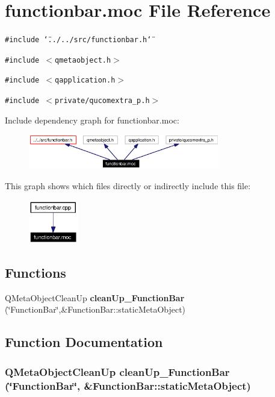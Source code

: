 \section{functionbar.moc File Reference}
\label{functionbar_8moc}


{\tt \#include \char`\"{}../../src/functionbar.h\char`\"{}}\par
{\tt \#include $<$qmetaobject.h$>$}\par
{\tt \#include $<$qapplication.h$>$}\par
{\tt \#include $<$private/qucomextra\_\-p.h$>$}\par


Include dependency graph for functionbar.moc:\begin{figure}[H]
\begin{center}
\leavevmode
\includegraphics[width=237pt]{functionbar_8moc__incl}
\end{center}
\end{figure}


This graph shows which files directly or indirectly include this file:\begin{figure}[H]
\begin{center}
\leavevmode
\includegraphics[width=61pt]{functionbar_8moc__dep__incl}
\end{center}
\end{figure}
\subsection*{Functions}
\begin{CompactItemize}
\item 
QMeta\-Object\-Clean\-Up {\bf clean\-Up\_\-Function\-Bar} (\char`\"{}Function\-Bar\char`\"{},\&Function\-Bar::static\-Meta\-Object)
\end{CompactItemize}


\subsection{Function Documentation}
\subsubsection{\setlength{\rightskip}{0pt plus 5cm}QMeta\-Object\-Clean\-Up clean\-Up\_\-Function\-Bar (\char`\"{}Function\-Bar\char`\"{}, \&Function\-Bar::static\-Meta\-Object)\hspace{0.3cm}{\tt  [static]}}\label{functionbar_8moc_a0}


